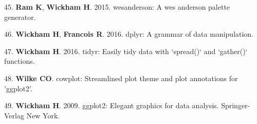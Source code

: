 \documentclass[11pt,]{article}
\begin{document}
45. \textbf{Ram K}, \textbf{Wickham H}. 2015. wesanderson: A wes
anderson palette generator.

46. \textbf{Wickham H}, \textbf{Francois R}. 2016. dplyr: A grammar of
data manipulation.

47. \textbf{Wickham H}. 2016. tidyr: Easily tidy data with `spread()`
and `gather()` functions.

48. \textbf{Wilke CO}. cowplot: Streamlined plot theme and plot
annotations for 'ggplot2'.

49. \textbf{Wickham H}. 2009. ggplot2: Elegant graphics for data
analysis. Springer-Verlag New York.
\end{document}
